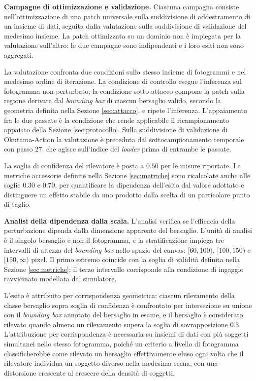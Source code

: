 \documentclass[a4paper,12pt]{report}
\begin{document}
\textbf{Campagne di ottimizzazione e validazione.}
\label{sec:campagne}
Ciascuna campagna consiste nell'ottimizzazione di una patch universale sulla
suddivisione di addestramento di un insieme di dati, seguita dalla valutazione
sulla suddivisione di validazione del medesimo insieme. La patch ottimizzata su
un dominio non è impiegata per la valutazione sull'altro: le due campagne sono
indipendenti e i loro esiti non sono aggregati.

La valutazione confronta due condizioni sullo stesso insieme di fotogrammi e nel
medesimo ordine di iterazione. La condizione di controllo esegue l'inferenza sul
fotogramma non perturbato; la condizione sotto attacco compone la patch sulla
regione derivata dal \textit{bounding box} di ciascun bersaglio valido, secondo
la geometria definita nella Sezione \ref{sec:attacco}, e ripete l'inferenza.
L'appaiamento fra le due passate è la condizione che rende applicabile il
ricampionamento appaiato della Sezione \ref{sec:protocollo}. Sulla suddivisione
di validazione di Okutama-Action la valutazione è preceduta dal
sottocampionamento temporale con passo $27$, che agisce sull'indice del
\textit{loader} prima di entrambe le passate.

La soglia di confidenza del rilevatore è posta a $0.50$ per le misure riportate.
Le metriche accessorie definite nella Sezione \ref{sec:metriche} sono
ricalcolate anche alle soglie $0.30$ e $0.70$, per quantificare la dipendenza
dell'esito dal valore adottato e distinguere un effetto stabile da uno prodotto
dalla scelta di un particolare punto di taglio.

\textbf{Analisi della dipendenza dalla scala.}
\label{sec:stratificazione}
L'analisi verifica se l'efficacia della perturbazione dipenda dalla dimensione
apparente del bersaglio. L'unità di analisi è il singolo bersaglio e non il
fotogramma, e la stratificazione impiega tre intervalli di altezza del
\textit{bounding box} nello spazio del canvas: $[60, 100)$, $[100, 150)$ e
$[150, \infty)$ pixel. Il primo estremo coincide con la soglia di validità
definita nella Sezione \ref{sec:metriche}; il terzo intervallo corrisponde alla
condizione di ingaggio ravvicinato modellata dal simulatore.

L'esito è attribuito per corrispondenza geometrica: ciascun rilevamento della
classe bersaglio sopra soglia di confidenza è confrontato per intersezione su
unione con il \textit{bounding box} annotato del bersaglio in esame, e il
bersaglio è considerato rilevato quando almeno un rilevamento supera la soglia
di sovrapposizione $0.3$. L'attribuzione per corrispondenza è necessaria su
insiemi di dati con più soggetti simultanei nello stesso fotogramma, poiché un
criterio a livello di fotogramma classificherebbe come rilevato un bersaglio
effettivamente eluso ogni volta che il rilevatore individua un soggetto diverso
nella medesima scena, con una distorsione crescente al crescere della densità di
soggetti.
\end{document}
